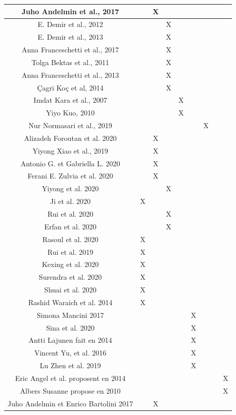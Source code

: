 \begin{center}
\begin{supertabular}{|*{9}{c|}}
		Juho Andelmin et al., 2017 & & X& &  & & & & \\ \hline%
		E. Demir et al., 2012 & &  & X & & & & & \\ \hline
		E. Demir et al., 2013 & &  & X & & & & &\\ \hline
		Anna Franceschetti et al., 2017 & &  & X & & & & & \\\hline 
		Tolga Bektas et al., 2011 & &  & X & & & & &\\\hline
		Anna Franceschetti et al., 2013 & &  & X & & & & & \\\hline
		Çagri Koç et al, 2014 & &  & X & & & & & \\\hline
		Imdat Kara et al., 2007 & &  &  &X & & & & \\ \hline
		Yiyo Kuo, 2010 & &  &  &X & & &  &\\ \hline
		Nur Normasari et al., 2019 & &  &  & & &X & &\\\hline 
		Alizadeh Foroutan et al. 2020 & & X &  & & & &  & \\ \hline
		Yiyong Xiao et al., 2019 & & X &  & & &  & &\\ \hline
		Antonio G. et Gabriella L. 2020 & & X &  & & & &  & \\\hline 
		Ferani E. Zulvia et al. 2020 & & X &  & & &  & & \\ \hline
		Yiyong et al. 2020 & & & X & & &  & &\\ \hline
		Ji et al. 2020 &X &  &  & & &  & &\\\hline
		Rui et al. 2020 & & & X & & &  & &\\\hline
		Erfan et al. 2020 & & & X & & &  & & \\\hline
		Rasoul et al. 2020&X &  &  & & &  & &\\\hline
		Rui et al. 2019&X &  &  & & &  & & \\\hline
		Kexing et al.  2020&X &  &  & & & & & \\\hline
		Surendra et al. 2020&X &  &  & & & & & \\\hline
		Shuai et al. 2020 &X &  &  & & &  & &\\\hline
		Rashid Waraich et al. 2014 &X &  &  & & & &  & \\\hline
		Simona Mancini 2017& &  &  & & X&  & &\\ \hline%
		Sina et al. 2020 & &  &  & & X&  & &\\ \hline
		Antti Lajunen fait en 2014 & &  &  & & X& &  &\\ \hline
		Vincent Yu, et al. 2016 & &  &  & & X&  & &\\ \hline
		Lu Zhen et al. 2019 & &  &  & & X&  & &\\ \hline
		Eric Angel et al. proposent en 2014 & &  &  & & &  & &X\\ \hline
		Albers Susanne propose en 2010 & &  &  & & &  & &X\\ \hline
		Juho Andelmin et Enrico Bartolini  2017 & &X  &  & & &  & &\\ \hline 
	\end{supertabular}
\end{center}


